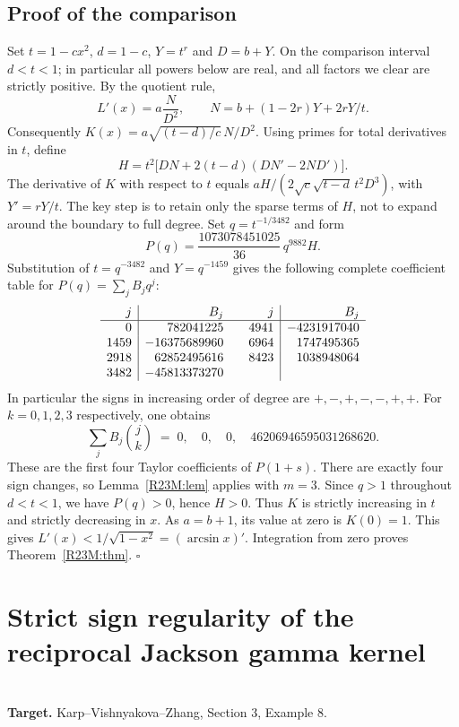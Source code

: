 \documentclass[11pt,a4paper]{article}
\begin{document}
\subsection*{Proof of the comparison}
Set $t=1-cx^2$, $d=1-c$, $Y=t^r$ and $D=b+Y$. On the comparison interval
$d<t<1$; in particular all powers below are real, and all factors we clear
are strictly positive. By the quotient rule,
\[
L'(x)=a\frac{N}{D^2},\qquad
N=b+(1-2r)Y+2rY/t .
\]
Consequently $K(x)=a\sqrt{(t-d)/c}\,N/D^2$. Using primes for total
derivatives in $t$, define
\[
H=t^2\bigl[DN+2(t-d)(DN'-2ND')\bigr].
\]
The derivative of $K$ with respect to $t$ equals
$aH/(2\sqrt{c}\sqrt{t-d}\,t^2D^3)$, with $Y'=rY/t$.
The key step is to retain only the sparse terms of $H$, not to expand around
the boundary to full degree. Set $q=t^{-1/3482}$ and form
\[
P(q)=\frac{1073078451025}{36}\,q^{9882}H .
\]
Substitution of $t=q^{-3482}$ and $Y=q^{-1459}$ gives the following complete
coefficient table for $P(q)=\sum_j B_j q^j$:
\[
\begin{array}{r|r@{\qquad}r|r}
j&B_j&j&B_j\\ \hline
0&782041225&4941&-4231917040\\
1459&-16375689960&6964&1747495365\\
2918&62852495616&8423&1038948064\\
3482&-45813373270&&
\end{array}
\]
In particular the signs in increasing order of degree are $+,-,+,-,-,+,+$.
For $k=0,1,2,3$ respectively, one obtains
\[
\sum_j B_j\binom{j}{k}
\;=\;0,\quad 0,\quad 0,\quad 46206946595031268620 .
\]
These are the first four Taylor coefficients of $P(1+s)$. There are exactly
four sign changes, so Lemma~\ref{R23M:lem} applies with $m=3$. Since $q>1$
throughout $d<t<1$, we have $P(q)>0$, hence $H>0$. Thus $K$ is strictly
increasing in $t$ and strictly decreasing in $x$. As $a=b+1$, its value
at zero is $K(0)=1$. This gives $L'(x)<1/\sqrt{1-x^2}=(\arcsin x)'$.
Integration from zero proves Theorem~\ref{R23M:thm}. \hfill$\square$
\endgroup


\clearpage

\section{Strict sign regularity of the reciprocal Jackson gamma kernel}
\label{section:R24Hq}
\\[3pt]
\noindent\textbf{Target.} Karp--Vishnyakova--Zhang, Section 3, Example 8.
\end{document}

